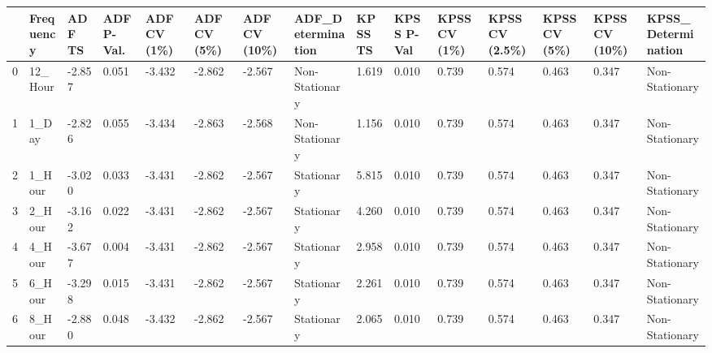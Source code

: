 \begin{tabular}{lllllllllllllll}
\toprule
 & Frequency & ADF TS & ADF P-Val. & ADF CV (1\%) & ADF CV (5\%) & ADF CV (10\%) & ADF_Determination & KPSS TS & KPSS P-Val & KPSS CV (1\%) & KPSS CV (2.5\%) & KPSS CV (5\%) & KPSS CV (10\%) & KPSS_Determination \\
\midrule
0 & 12_Hour & -2.857 & 0.051 & -3.432 & -2.862 & -2.567 & Non-Stationary & 1.619 & 0.010 & 0.739 & 0.574 & 0.463 & 0.347 & Non-Stationary \\
1 & 1_Day & -2.826 & 0.055 & -3.434 & -2.863 & -2.568 & Non-Stationary & 1.156 & 0.010 & 0.739 & 0.574 & 0.463 & 0.347 & Non-Stationary \\
2 & 1_Hour & -3.020 & 0.033 & -3.431 & -2.862 & -2.567 & Stationary & 5.815 & 0.010 & 0.739 & 0.574 & 0.463 & 0.347 & Non-Stationary \\
3 & 2_Hour & -3.162 & 0.022 & -3.431 & -2.862 & -2.567 & Stationary & 4.260 & 0.010 & 0.739 & 0.574 & 0.463 & 0.347 & Non-Stationary \\
4 & 4_Hour & -3.677 & 0.004 & -3.431 & -2.862 & -2.567 & Stationary & 2.958 & 0.010 & 0.739 & 0.574 & 0.463 & 0.347 & Non-Stationary \\
5 & 6_Hour & -3.298 & 0.015 & -3.431 & -2.862 & -2.567 & Stationary & 2.261 & 0.010 & 0.739 & 0.574 & 0.463 & 0.347 & Non-Stationary \\
6 & 8_Hour & -2.880 & 0.048 & -3.432 & -2.862 & -2.567 & Stationary & 2.065 & 0.010 & 0.739 & 0.574 & 0.463 & 0.347 & Non-Stationary \\
\bottomrule
\end{tabular}
